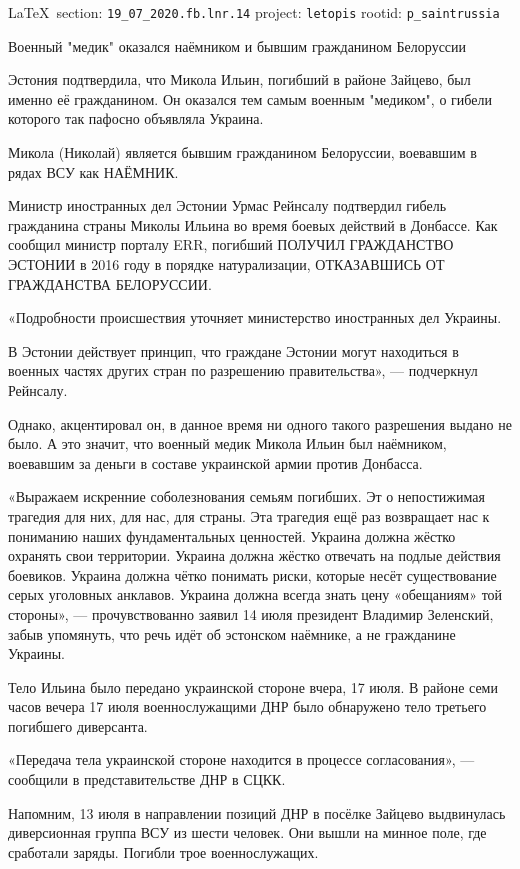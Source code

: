 \documentclass[a4paper,11pt]{extreport}
\begin{document}
\vspace{0.5cm}
{\small\LaTeX~section: \verb|19_07_2020.fb.lnr.14| project: \verb|letopis| rootid: \verb|p_saintrussia|}
\vspace{0.5cm}

Военный "медик" оказался наёмником и бывшим гражданином Белоруссии

Эстония подтвердила, что Микола Ильин, погибший в районе Зайцево, был именно её
гражданином.  Он оказался тем самым военным "медиком", о гибели которого так
пафосно объявляла Украина.

Микола (Николай) является бывшим гражданином Белоруссии, воевавшим в рядах ВСУ
как НАЁМНИК.

Министр иностранных дел Эстонии Урмас Рейнсалу подтвердил гибель гражданина
страны Миколы Ильина во время боевых действий в Донбассе.  Как сообщил министр
порталу ERR, погибший ПОЛУЧИЛ ГРАЖДАНСТВО ЭСТОНИИ в 2016 году в порядке
натурализации, ОТКАЗАВШИСЬ ОТ ГРАЖДАНСТВА БЕЛОРУССИИ.

«Подробности происшествия уточняет министерство иностранных дел Украины.

В Эстонии действует принцип, что граждане Эстонии могут находиться в военных
частях других стран по разрешению правительства», --- подчеркнул Рейнсалу.

Однако, акцентировал он, в данное время ни одного такого разрешения выдано не
было.  А это значит, что военный медик Микола Ильин был наёмником, воевавшим
за деньги в составе украинской армии против Донбасса.

«Выражаем искренние соболезнования семьям погибших. Эт о непостижимая трагедия
для них, для нас, для страны. Эта трагедия ещё раз возвращает нас к пониманию
наших фундаментальных ценностей. Украина должна жёстко охранять свои
территории. Украина должна жёстко отвечать на подлые действия боевиков. Украина
должна чётко понимать риски, которые несёт существование серых уголовных
анклавов. Украина должна всегда знать цену «обещаниям» той стороны», —
прочувствованно заявил 14 июля президент Владимир Зеленский, забыв упомянуть,
что речь идёт об эстонском наёмнике, а не гражданине Украины.

Тело Ильина было передано украинской стороне вчера, 17 июля.  В районе семи
часов вечера 17 июля военнослужащими ДНР было обнаружено тело третьего
погибшего диверсанта.

«Передача тела украинской стороне находится в процессе согласования», —
сообщили в представительстве ДНР в СЦКК.

Напомним, 13 июля в направлении позиций ДНР в посёлке Зайцево выдвинулась
диверсионная группа ВСУ из шести человек.  Они вышли на минное поле, где
сработали заряды.  Погибли трое военнослужащих.
 
\end{document}
